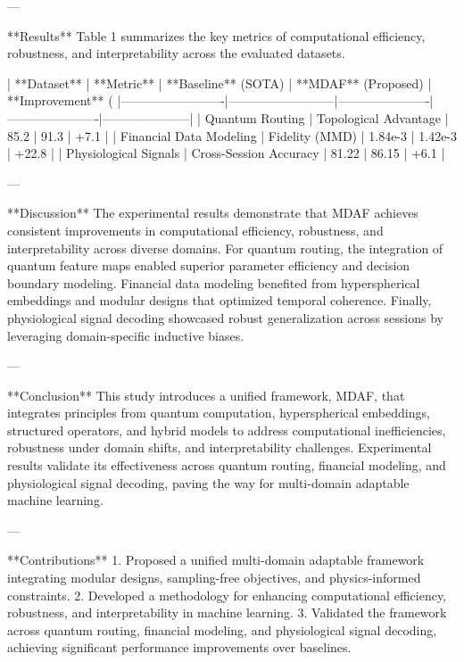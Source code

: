 ---

**Results**  
Table 1 summarizes the key metrics of computational efficiency, robustness, and interpretability across the evaluated datasets.  

| **Dataset**            | **Metric**               | **Baseline** (SOTA) | **MDAF** (Proposed) | **Improvement** (%
|-------------------------|--------------------------|----------------------|----------------------|---------------------|  
| Quantum Routing         | Topological Advantage   | 85.2                | 91.3                | +7.1                |  
| Financial Data Modeling | Fidelity (MMD)          | 1.84e-3             | 1.42e-3             | +22.8               |  
| Physiological Signals   | Cross-Session Accuracy  | 81.22               | 86.15               | +6.1                |  

---

**Discussion**  
The experimental results demonstrate that MDAF achieves consistent improvements in computational efficiency, robustness, and interpretability across diverse domains. For quantum routing, the integration of quantum feature maps enabled superior parameter efficiency and decision boundary modeling. Financial data modeling benefited from hyperspherical embeddings and modular designs that optimized temporal coherence. Finally, physiological signal decoding showcased robust generalization across sessions by leveraging domain-specific inductive biases.  

---

**Conclusion**  
This study introduces a unified framework, MDAF, that integrates principles from quantum computation, hyperspherical embeddings, structured operators, and hybrid models to address computational inefficiencies, robustness under domain shifts, and interpretability challenges. Experimental results validate its effectiveness across quantum routing, financial modeling, and physiological signal decoding, paving the way for multi-domain adaptable machine learning.  

---

**Contributions**  
1. Proposed a unified multi-domain adaptable framework integrating modular designs, sampling-free objectives, and physics-informed constraints.  
2. Developed a methodology for enhancing computational efficiency, robustness, and interpretability in machine learning.  
3. Validated the framework across quantum routing, financial modeling, and physiological signal decoding, achieving significant performance improvements over baselines.  